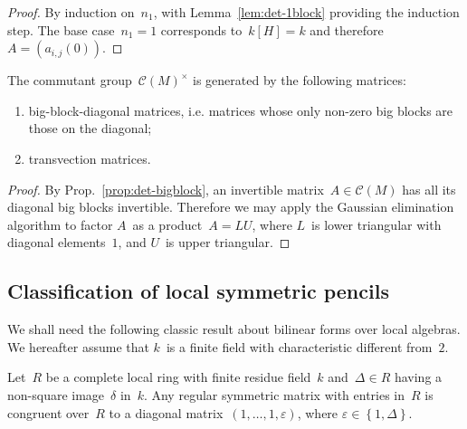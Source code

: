 \documentclass{article}%
\let\ro\mathscr
\def\acco#1{\left\{#1\right\}}
\begin{document}
\begin{proof}
By induction on~$n_1$, with Lemma~\ref{lem:det-1block} providing the
induction step. The base case~$n_1 = 1$ corresponds to~$k[H] = k$ and
therefore~$A = (a_{i,j}(0))$.
\end{proof}
\begin{prop}\label{prop:structure-gl}%
The commutant group~$\ro C(M)^{×}$ is
generated by the following matrices:
\begin{enumerate}
\item big-block-diagonal matrices, i.e. matrices whose only non-zero big
blocks are those on the diagonal;
\item transvection matrices.
\end{enumerate}
\end{prop}

\begin{proof}
By Prop.~\ref{prop:det-bigblock}, an invertible matrix~$A ∈ \ro C(M)$ has
all its diagonal big blocks invertible. Therefore we may apply the
Gaussian elimination algorithm to factor $A$~as a product~$A = LU$, where
$L$~is lower triangular with diagonal elements~$1$, and $U$~is upper
triangular.
\end{proof}%

\subsection{Classification of local symmetric pencils}%
\label{ss:quadratic-forms}

We shall need the following classic result about bilinear forms over
local algebras. We hereafter assume that $k$~is a finite field with
characteristic different from~$2$.

\begin{prop}\label{prop:local-diag}%
Let~$R$ be a complete local ring with finite residue field~$k$ and~$Δ ∈
R$ having a non-square image~$δ$ in~$k$. Any regular symmetric matrix
with entries in~$R$ is congruent over~$R$ to a diagonal matrix~$(1, …, 1,
ε)$, where $ε ∈ \acco{1, Δ}$.
\end{prop}
\end{document}
